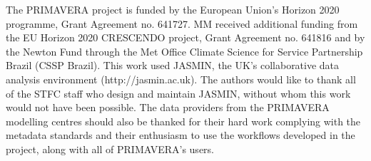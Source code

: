 \documentclass[gmd, manuscript]{copernicus}
\begin{document}

\begin{acknowledgements}
The PRIMAVERA project is funded by the European Union's Horizon 2020 programme, Grant Agreement no. 641727. MM received additional funding from the EU Horizon 2020 CRESCENDO project, Grant Agreement no. 641816 and by the Newton Fund through the Met Office Climate Science for Service Partnership Brazil (CSSP Brazil). This work used JASMIN, the UK's collaborative data analysis environment (http://jasmin.ac.uk). The authors would like to thank all of the STFC staff who design and maintain JASMIN, without whom this work would not have been possible. The data providers from the PRIMAVERA modelling centres should also be thanked for their hard work complying with the metadata standards and their enthusiasm to use the workflows developed in the project, along with all of PRIMAVERA's users.
\end{acknowledgements}



%
%
%









\end{document}
